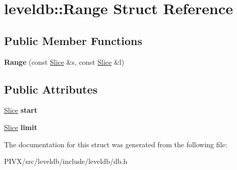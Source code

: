 \hypertarget{structleveldb_1_1_range}{}\section{leveldb\+:\+:Range Struct Reference}
\label{structleveldb_1_1_range}
\subsection*{Public Member Functions}
\begin{DoxyCompactItemize}
\item 
\mbox{\label{structleveldb_1_1_range_a797d5e3b58cc615dfb805965d06bdcbf}} 
{\bfseries Range} (const \mbox{\hyperlink{classleveldb_1_1_slice}{Slice}} \&s, const \mbox{\hyperlink{classleveldb_1_1_slice}{Slice}} \&l)
\end{DoxyCompactItemize}
\subsection*{Public Attributes}
\begin{DoxyCompactItemize}
\item 
\mbox{\label{structleveldb_1_1_range_ad80a55e20eb7d864d497e8f94953c00d}} 
\mbox{\hyperlink{classleveldb_1_1_slice}{Slice}} {\bfseries start}
\item 
\mbox{\label{structleveldb_1_1_range_a9c45c46ac20a1c86c265f1f9c35d6632}} 
\mbox{\hyperlink{classleveldb_1_1_slice}{Slice}} {\bfseries limit}
\end{DoxyCompactItemize}


The documentation for this struct was generated from the following file\+:\begin{DoxyCompactItemize}
\item 
P\+I\+V\+X/src/leveldb/include/leveldb/db.\+h\end{DoxyCompactItemize}
